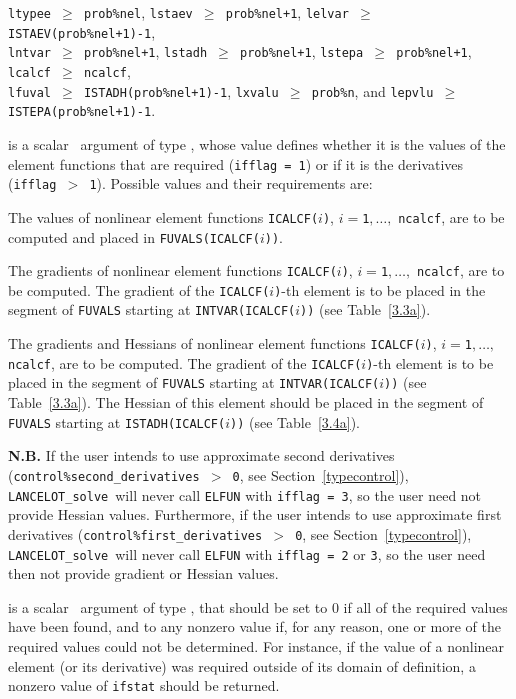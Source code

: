 \documentclass{galahad}
\newcommand{\fullpackagename}{LANC\-E\-LOT}
\newcommand{\solver}{{\tt \fullpackagename\_solve}}
\begin{document}
\begin{description}
\restrictions
{\tt ltypee $\geq$ prob\%nel},
{\tt lstaev $\geq$ prob\%nel+1},
{\tt lelvar $\geq$ ISTAEV(prob\%nel+1)-1}, \\
{\tt lntvar $\geq$ prob\%nel+1},
{\tt lstadh $\geq$ prob\%nel+1},
{\tt lstepa $\geq$ prob\%nel+1},
{\tt lcalcf $\geq$ ncalcf}, \\
{\tt lfuval $\geq$ ISTADH(prob\%nel+1)-1},
{\tt lxvalu $\geq$ prob\%n}, and
{\tt lepvlu $\geq$ ISTEPA(prob\%nel+1)-1}.

 is a scalar \intentin\ argument of type \integer,
whose value defines whether it is the values of the element functions
that are required ({\tt ifflag = 1}) or if it is the derivatives
({\tt ifflag $>$ 1}). Possible values and their requirements are:
\begin{description}

 The values of nonlinear element functions
{\tt ICALCF($i$)}, $i = ${\tt 1}$, \ldots ,$ {\tt ncalcf}, are to be computed
and placed in {\tt FUVALS(ICALCF($i$))}.

 The gradients of nonlinear element functions
{\tt ICALCF($i$)}, $i = ${\tt 1}$, \ldots ,$ {\tt ncalcf}, are to be computed.
The gradient of the {\tt ICALCF($i$)}-th element is to be placed in
the segment of {\tt FUVALS} starting at {\tt INTVAR(ICALCF($i$))}
(see Table~\ref{3.3a}).

 The gradients and Hessians
of nonlinear element functions
{\tt ICALCF($i$)}, $i = ${\tt 1}$, \ldots ,$ {\tt ncalcf}, are to be computed.
The gradient of the {\tt ICALCF($i$)}-th element is to be placed in
the segment of {\tt FUVALS} starting at {\tt INTVAR(ICALCF($i$))}
(see Table~\ref{3.3a}).
The Hessian of this element should be placed in
the segment of {\tt FUVALS} starting at {\tt ISTADH(ICALCF($i$))}
(see Table~\ref{3.4a}).

\end{description}
{\bf N.B.} If the user intends to use approximate second derivatives
({\tt control\%second\_derivatives $>$ 0}, see Section~\ref{typecontrol}),
\solver\ will never call {\tt ELFUN} with {\tt ifflag = 3}, so the
user need not provide Hessian values. Furthermore, if the user
intends to use approximate first derivatives
({\tt control\%first\_derivatives $>$ 0}, see Section~\ref{typecontrol}),
\solver\ will never call {\tt ELFUN} with {\tt ifflag = 2} or {\tt 3}, so the
user need then not provide gradient or Hessian values.

 is a scalar \intentout\ argument of type \integer,
that should be set to 0 if all of the required values have been found,
and to any nonzero value if, for any reason, one or more of the required
values could not be determined. For instance, if the value of a
nonlinear element (or its derivative) was required outside of its domain of
definition, a nonzero value of {\tt ifstat} should be returned.

\end{description}
\end{document}
